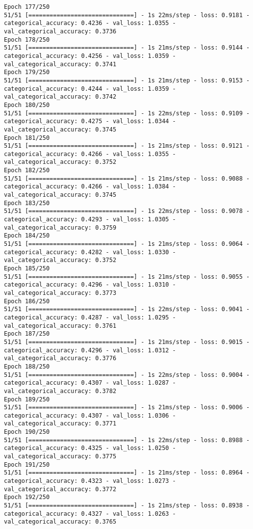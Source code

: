 \begin{lstlisting}
Epoch 177/250
51/51 [==============================] - 1s 22ms/step - loss: 0.9181 - categorical_accuracy: 0.4236 - val_loss: 1.0355 - val_categorical_accuracy: 0.3736
Epoch 178/250
51/51 [==============================] - 1s 21ms/step - loss: 0.9144 - categorical_accuracy: 0.4256 - val_loss: 1.0359 - val_categorical_accuracy: 0.3741
Epoch 179/250
51/51 [==============================] - 1s 21ms/step - loss: 0.9153 - categorical_accuracy: 0.4244 - val_loss: 1.0359 - val_categorical_accuracy: 0.3742
Epoch 180/250
51/51 [==============================] - 1s 22ms/step - loss: 0.9109 - categorical_accuracy: 0.4275 - val_loss: 1.0344 - val_categorical_accuracy: 0.3745
Epoch 181/250
51/51 [==============================] - 1s 21ms/step - loss: 0.9121 - categorical_accuracy: 0.4266 - val_loss: 1.0355 - val_categorical_accuracy: 0.3752
Epoch 182/250
51/51 [==============================] - 1s 21ms/step - loss: 0.9088 - categorical_accuracy: 0.4266 - val_loss: 1.0384 - val_categorical_accuracy: 0.3745
Epoch 183/250
51/51 [==============================] - 1s 22ms/step - loss: 0.9078 - categorical_accuracy: 0.4293 - val_loss: 1.0305 - val_categorical_accuracy: 0.3759
Epoch 184/250
51/51 [==============================] - 1s 21ms/step - loss: 0.9064 - categorical_accuracy: 0.4282 - val_loss: 1.0330 - val_categorical_accuracy: 0.3752
Epoch 185/250
51/51 [==============================] - 1s 21ms/step - loss: 0.9055 - categorical_accuracy: 0.4296 - val_loss: 1.0310 - val_categorical_accuracy: 0.3773
Epoch 186/250
51/51 [==============================] - 1s 22ms/step - loss: 0.9041 - categorical_accuracy: 0.4287 - val_loss: 1.0295 - val_categorical_accuracy: 0.3761
Epoch 187/250
51/51 [==============================] - 1s 21ms/step - loss: 0.9015 - categorical_accuracy: 0.4296 - val_loss: 1.0312 - val_categorical_accuracy: 0.3776
Epoch 188/250
51/51 [==============================] - 1s 22ms/step - loss: 0.9004 - categorical_accuracy: 0.4307 - val_loss: 1.0287 - val_categorical_accuracy: 0.3782
Epoch 189/250
51/51 [==============================] - 1s 21ms/step - loss: 0.9006 - categorical_accuracy: 0.4307 - val_loss: 1.0306 - val_categorical_accuracy: 0.3771
Epoch 190/250
51/51 [==============================] - 1s 22ms/step - loss: 0.8988 - categorical_accuracy: 0.4325 - val_loss: 1.0250 - val_categorical_accuracy: 0.3775
Epoch 191/250
51/51 [==============================] - 1s 21ms/step - loss: 0.8964 - categorical_accuracy: 0.4323 - val_loss: 1.0273 - val_categorical_accuracy: 0.3772
Epoch 192/250
51/51 [==============================] - 1s 21ms/step - loss: 0.8938 - categorical_accuracy: 0.4327 - val_loss: 1.0263 - val_categorical_accuracy: 0.3765

\end{lstlisting}

